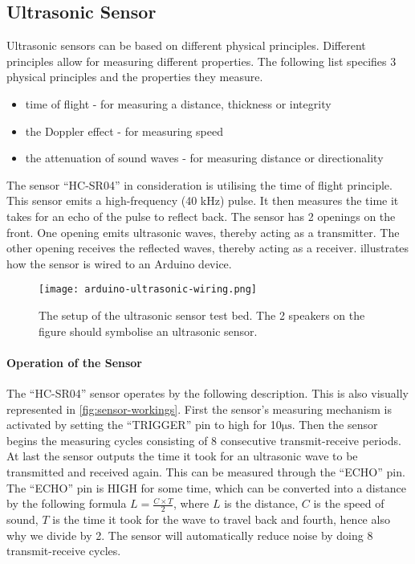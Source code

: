 \subsection{Ultrasonic Sensor}\label{sub:ultrasonic}

Ultrasonic sensors can be based on different physical principles. Different principles allow for measuring different properties. The following list specifies 3 physical principles and the properties they measure.

\begin{itemize}
  \item time of flight - for measuring a distance, thickness or integrity\cite{ultrasound2}
  \item the Doppler effect - for measuring speed\cite{ultrasound}
  \item the attenuation of sound waves - for measuring distance or directionality\cite{ultrasound}
\end{itemize}

The sensor \enquote{HC-SR04} in consideration is utilising the time of flight principle. This sensor emits a high-frequency (40 kHz) pulse. It then measures the time it takes for an echo of the pulse to reflect back. The sensor has 2 openings on the front. One opening emits ultrasonic waves, thereby acting as a transmitter. The other opening receives the reflected waves, thereby acting as a receiver.  illustrates how the sensor is wired to an Arduino device.

\begin{figure}[htbp]
  \centering
  \texttt{[image: arduino-ultrasonic-wiring.png]}
  \caption[The setup of the ultrasonic sensor test bed]{The setup of the ultrasonic sensor test bed. The 2 speakers on the figure should symbolise an ultrasonic sensor.}\label{fig:ultrasonicwiring}
\end{figure}

\paragraph{Operation of the Sensor}
The \enquote{HC-SR04} sensor operates by the following description. This is also visually represented in \cref{fig:sensor-workings}. First the sensor's measuring mechanism is activated by setting the \enquote{TRIGGER} pin to high for 10$\si{\micro\second}$. Then the sensor begins the measuring cycles consisting of 8 consecutive transmit-receive periods. At last the sensor outputs the time it took for an ultrasonic wave to be transmitted and received again. This can be measured through the \enquote{ECHO} pin. The \enquote{ECHO} pin is HIGH for some time, which can be converted into a distance by the following formula $L = \frac{C \times T}{2}$, where $L$ is the distance, $C$ is the speed of sound, $T$ is the time it took for the wave to travel back and fourth, hence also why we divide by 2. The sensor will automatically reduce noise by doing 8 transmit-receive cycles.


